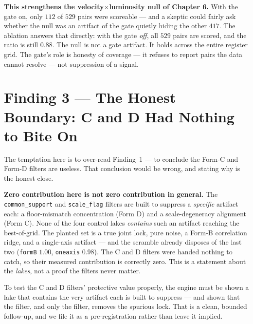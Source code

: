 \documentclass[11pt, letterpaper, openany]{book}
\begin{document}
\begin{signalbox}
\textbf{This strengthens the velocity$\times$luminosity null of Chapter 6.} With the gate on, only $112$
of $529$ pairs were scoreable --- and a skeptic could fairly ask whether the null was an artifact of the
gate quietly hiding the other $417$. The ablation answers that directly: with the gate \emph{off}, all
$529$ pairs are scored, and the ratio is still $0.88$. The null is not a gate artifact. It holds across
the entire register grid. The gate's role is honesty of coverage --- it refuses to report pairs the data
cannot resolve --- not suppression of a signal.
\end{signalbox}

\section{Finding 3 --- The Honest Boundary: C and D Had Nothing to Bite On}

The temptation here is to over-read Finding~1 --- to conclude the Form-C and Form-D filters are useless.
That conclusion would be wrong, and stating why is the honest close.

\begin{correctionbox}
\textbf{Zero contribution here is not zero contribution in general.} The \texttt{common\_support} and
\texttt{scale\_flag} filters are built to suppress a \emph{specific} artifact each: a floor-mismatch
concentration (Form D) and a scale-degeneracy alignment (Form C). None of the four control lakes
\emph{contains} such an artifact reaching the best-of-grid. The planted set is a true joint lock, pure
noise, a Form-B correlation ridge, and a single-axis artifact --- and the scramble already disposes of
the last two (\texttt{formB} $1.00$, \texttt{oneaxis} $0.98$). The C and D filters were handed nothing to
catch, so their measured contribution is correctly zero. This is a statement about the \emph{lakes}, not
a proof the filters never matter.
\end{correctionbox}

To test the C and D filters' protective value properly, the engine must be shown a lake that contains the
very artifact each is built to suppress --- and shown that the filter, and only the filter, removes the
spurious lock. That is a clean, bounded follow-up, and we file it as a pre-registration rather than leave
it implied.
\end{document}
